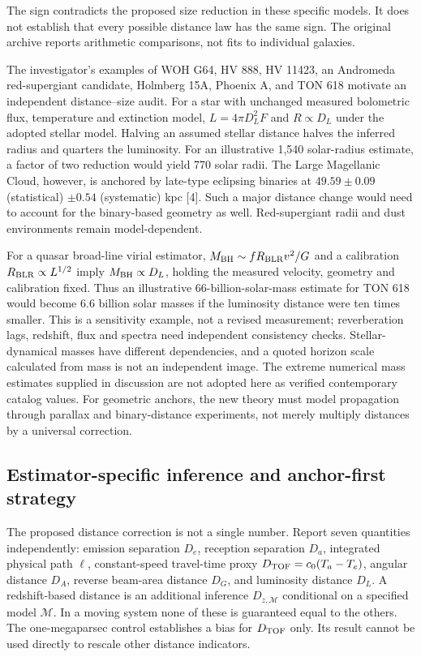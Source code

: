 \documentclass[
  11pt,
  twoside]{article}
\begin{document}
The sign contradicts the proposed size reduction in these specific
models. It does not establish that every possible distance law has the
same sign. The original archive reports arithmetic comparisons, not fits
to individual galaxies.

The investigator's examples of WOH G64, HV 888, HV 11423, an Andromeda
red-supergiant candidate, Holmberg 15A, Phoenix A, and TON 618 motivate
an independent distance--size audit. For a star with unchanged measured
bolometric flux, temperature and extinction model, \(L=4\pi D_L^2 F\)
and \(R\propto D_L\) under the adopted stellar model. Halving an assumed
stellar distance halves the inferred radius and quarters the luminosity.
For an illustrative 1,540 solar-radius estimate, a factor of two
reduction would yield 770 solar radii. The Large Magellanic Cloud,
however, is anchored by late-type eclipsing binaries at \(49.59\pm0.09\)
(statistical) \(\pm0.54\) (systematic) kpc {[}4{]}. Such a major
distance change would need to account for the binary-based geometry as
well. Red-supergiant radii and dust environments remain model-dependent.

For a quasar broad-line virial estimator,
\(M_{\rm BH}\sim fR_{\rm BLR}v^2/G\) and a calibration
\(R_{\rm BLR}\propto L^{1/2}\) imply \(M_{\rm BH}\propto D_L\), holding
the measured velocity, geometry and calibration fixed. Thus an
illustrative 66-billion-solar-mass estimate for TON 618 would become 6.6
billion solar masses if the luminosity distance were ten times smaller.
This is a sensitivity example, not a revised measurement; reverberation
lags, redshift, flux and spectra need independent consistency checks.
Stellar-dynamical masses have different dependencies, and a quoted
horizon scale calculated from mass is not an independent image. The
extreme numerical mass estimates supplied in discussion are not adopted
here as verified contemporary catalog values. For geometric anchors, the
new theory must model propagation through parallax and binary-distance
experiments, not merely multiply distances by a universal correction.

\subsection{Estimator-specific inference and anchor-first
strategy}\label{estimator-specific-inference-and-anchor-first-strategy}

The proposed distance correction is not a single number. Report seven
quantities independently: emission separation \(D_e\), reception
separation \(D_a\), integrated physical path \(\ell\), constant-speed
travel-time proxy \(D_{\rm TOF}=c_0(T_a-T_e)\), angular distance
\(D_A\), reverse beam-area distance \(D_G\), and luminosity distance
\(D_L\). A redshift-based distance is an additional inference
\(D_{z,\mathcal M}\) conditional on a specified model \(\mathcal M\). In
a moving system none of these is guaranteed equal to the others. The
one-megaparsec control establishes a bias for \(D_{\rm TOF}\) only. Its
result cannot be used directly to rescale other distance indicators.
\end{document}
